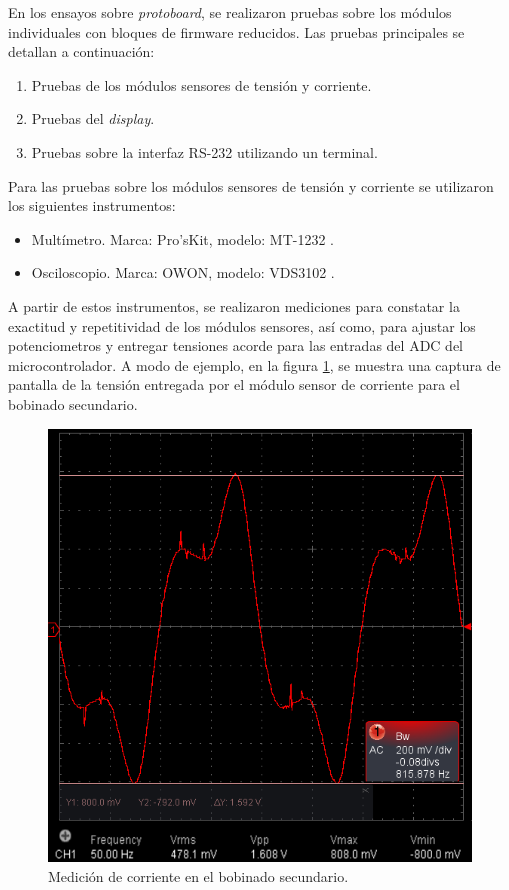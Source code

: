 En los ensayos sobre \textit{protoboard}, se realizaron pruebas sobre los módulos individuales con bloques de firmware reducidos. Las pruebas principales se detallan a continuación:
\begin{enumerate}
	\item Pruebas de los módulos sensores de tensión y corriente.
	\item Pruebas del \textit{display}.
	\item Pruebas sobre la interfaz RS-232 utilizando un terminal.
\end{enumerate}

Para las pruebas sobre los módulos sensores de tensión y corriente se utilizaron los siguientes instrumentos:
\begin{itemize}
\item Multímetro. Marca: Pro'sKit, modelo: MT-1232 \citep{MT1232}.
\item Osciloscopio. Marca: OWON, modelo: VDS3102  \citep{VDS3102}.
\end{itemize}

A partir de estos instrumentos, se realizaron mediciones para constatar la exactitud y repetitividad de los módulos sensores, así como, para ajustar los potenciometros y entregar tensiones acorde para las entradas del ADC del microcontrolador. A modo de ejemplo, en la figura \ref{fig:ISOsc}, se muestra una captura de pantalla de la tensión entregada por el módulo sensor de corriente para el bobinado secundario.

\begin{figure}[htpb]
	\centering
	\includegraphics[scale=0.6]{./Figures/osc_is.png}
	\caption{Medición de corriente en el bobinado secundario.}
	\label{fig:ISOsc}
\end{figure}

